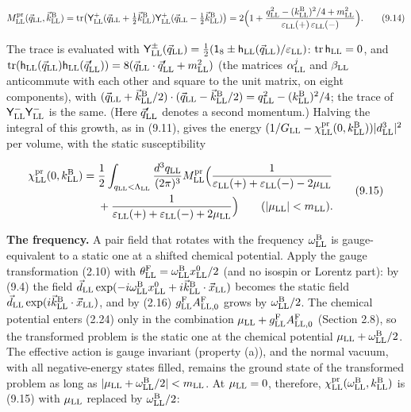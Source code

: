 \documentclass[
  10pt,
]{article}
\begin{document}
\[M^{\rm pr}_{\rm LL}(\vec q_{\rm LL},\vec k^{\rm B}_{\rm LL})={\rm tr}\big(\mathsf Y^+_{\rm LL}(\vec q_{\rm LL}+\tfrac12\vec k^{\rm B}_{\rm LL})\mathsf Y^+_{\rm LL}(\vec q_{\rm LL}-\tfrac12\vec k^{\rm B}_{\rm LL})\big)=2\Big(1+\frac{q_{\rm LL}^2-(k^{\rm B}_{\rm LL})^2/4+m_{\rm LL}^2}{\varepsilon_{\rm LL}(+)\,\varepsilon_{\rm LL}(-)}\Big).\tag{9.14}\]

The trace is evaluated with
\(\mathsf Y^\pm_{\rm LL}(\vec q_{\rm LL})=\tfrac12(\mathsf 1_8\pm\mathsf h_{\rm LL}(\vec q_{\rm LL})/\varepsilon_{\rm LL})\):
\({\rm tr}\,\mathsf h_{\rm LL}=0\), and
\({\rm tr}(\mathsf h_{\rm LL}(\vec q_{\rm LL})\mathsf h_{\rm LL}(\vec q'_{\rm LL}))=8(\vec q_{\rm LL}\cdot\vec q'_{\rm LL}+m_{\rm LL}^2)\)
(the matrices \(\alpha^j_{\rm LL}\) and \(\beta_{\rm LL}\) anticommute
with each other and square to the unit matrix, on eight components),
with
\((\vec q_{\rm LL}+\vec k^{\rm B}_{\rm LL}/2)\cdot(\vec q_{\rm LL}-\vec k^{\rm B}_{\rm LL}/2)=q_{\rm LL}^2-(k^{\rm B}_{\rm LL})^2/4\);
the trace of \(\mathsf Y^-_{\rm LL}\mathsf Y^-_{\rm LL}\) is the same.
(Here \(\vec q'_{\rm LL}\) denotes a second momentum.) Halving the
integral of this growth, as in (9.11), gives the energy
\((1/G_{\rm LL}-\chi^{\rm pr}_{\rm LL}(0,k^{\rm B}_{\rm LL}))\lvert d^3_{\rm LL}\rvert^2\)
per volume, with the static susceptibility

\[\begin{aligned}\chi^{\rm pr}_{\rm LL}(0,k^{\rm B}_{\rm LL})={}&\frac12\int_{q_{\rm LL}<\Lambda_{\rm LL}}\frac{d^3q_{\rm LL}}{(2\pi)^3}M^{\rm pr}_{\rm LL}\Big(\frac1{\varepsilon_{\rm LL}(+)+\varepsilon_{\rm LL}(-)-2\mu_{\rm LL}}\\&+\frac1{\varepsilon_{\rm LL}(+)+\varepsilon_{\rm LL}(-)+2\mu_{\rm LL}}\Big)\qquad(\lvert\mu_{\rm LL}\rvert<m_{\rm LL}).\end{aligned}\tag{9.15}\]

\textbf{The frequency.} A pair field that rotates with the frequency
\(\omega^{\rm B}_{\rm LL}\) is gauge-equivalent to a static one at a
shifted chemical potential. Apply the gauge transformation (2.10) with
\(\theta^{\rm F}_{\rm LL}=\omega^{\rm B}_{\rm LL}x^0_{\rm LL}/2\) (and
no isospin or Lorentz part): by (9.4) the field
\(\vec d_{\rm LL}\exp(-i\omega^{\rm B}_{\rm LL}x^0_{\rm LL}+i\vec k^{\rm B}_{\rm LL}\cdot\vec x_{\rm LL})\)
becomes the static field
\(\vec d_{\rm LL}\exp(i\vec k^{\rm B}_{\rm LL}\cdot\vec x_{\rm LL})\),
and by (2.16) \(g^{\rm F}_{\rm LL}A^{\rm F}_{{\rm LL},0}\) grows by
\(\omega^{\rm B}_{\rm LL}/2\). The chemical potential enters (2.24) only
in the combination
\(\mu_{\rm LL}+g^{\rm F}_{\rm LL}A^{\rm F}_{{\rm LL},0}\) (Section 2.8),
so the transformed problem is the static one at the chemical potential
\(\mu_{\rm LL}+\omega^{\rm B}_{\rm LL}/2\). The effective action is
gauge invariant (property (a)), and the normal vacuum, with all
negative-energy states filled, remains the ground state of the
transformed problem as long as
\(\lvert\mu_{\rm LL}+\omega^{\rm B}_{\rm LL}/2\rvert<m_{\rm LL}\). At
\(\mu_{\rm LL}=0\), therefore,
\(\chi^{\rm pr}_{\rm LL}(\omega^{\rm B}_{\rm LL},k^{\rm B}_{\rm LL})\)
is (9.15) with \(\mu_{\rm LL}\) replaced by
\(\omega^{\rm B}_{\rm LL}/2\):
\end{document}
